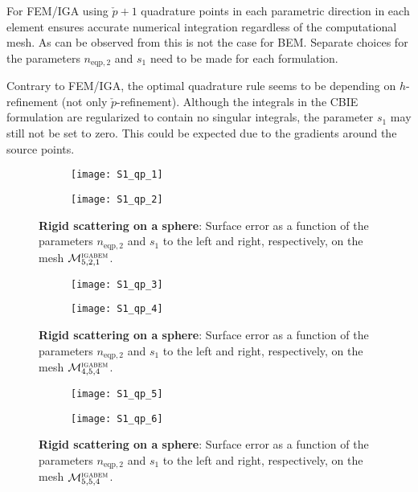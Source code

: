 For FEM/IGA using $\check{p}+1$ quadrature points in each parametric direction in each element ensures accurate numerical integration regardless of the computational mesh. As can be observed from  this is not the case for BEM. Separate choices for the parameters $n_{\mathrm{eqp},2}$ and $s_1$ need to be made for each formulation. 

Contrary to FEM/IGA, the optimal quadrature rule seems to be depending on $h$-refinement (not only $\check{p}$-refinement). Although the integrals in the CBIE formulation are regularized to contain no singular integrals, the parameter $s_1$ may still not be set to zero. This could be expected due to the gradients around the source points.

\begin{figure}
	\centering    
	\begin{subfigure}[t]{0.49\textwidth}
		\centering
		\texttt{[image: S1\_qp\_1]}
	\end{subfigure}%
	\hspace*{0.02\textwidth}%
	\begin{subfigure}[t]{0.49\textwidth}
		\centering
		\texttt{[image: S1\_qp\_2]}
	\end{subfigure}
	\caption{\textbf{Rigid scattering on a sphere}: Surface error as a function of the parameters $n_{\mathrm{eqp},2}$ and $s_1$ to the left and right, respectively, on the mesh ${\cal M}_{5,2,1}^{\textsc{igabem}}$.}
	\label{Fig3:S1_qp_M5p2}
\end{figure}
\begin{figure}
	\centering
	\begin{subfigure}[t]{0.49\textwidth}
		\centering
		\texttt{[image: S1\_qp\_3]}
	\end{subfigure}%
	\hspace*{0.02\textwidth}%
	\begin{subfigure}[t]{0.49\textwidth}
		\centering
		\texttt{[image: S1\_qp\_4]}
	\end{subfigure}
	\caption{\textbf{Rigid scattering on a sphere}: Surface error as a function of the parameters $n_{\mathrm{eqp},2}$ and $s_1$ to the left and right, respectively, on the mesh ${\cal M}_{4,5,4}^{\textsc{igabem}}$.}
	\label{Fig3:S1_qp_M4p5}
\end{figure}
\begin{figure}
	\centering
	\begin{subfigure}[t]{0.49\textwidth}
		\centering
		\texttt{[image: S1\_qp\_5]}
	\end{subfigure}%
	\hspace*{0.02\textwidth}%
	\begin{subfigure}[t]{0.49\textwidth}
		\centering
		\texttt{[image: S1\_qp\_6]}
	\end{subfigure}
	\caption{\textbf{Rigid scattering on a sphere}: Surface error as a function of the parameters $n_{\mathrm{eqp},2}$ and $s_1$ to the left and right, respectively, on the mesh ${\cal M}_{5,5,4}^{\textsc{igabem}}$.}
	\label{Fig3:S1_qp_M5p5}
\end{figure}

